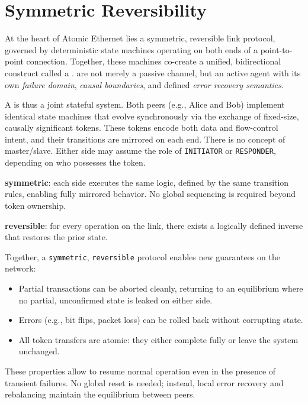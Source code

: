 \documentclass[../../../OAE-SPEC-MAIN.tex]{subfiles}
\begin{document}
\section{Symmetric Reversibility}

At the heart of Atomic Ethernet lies a symmetric, reversible link protocol, governed by deterministic state machines operating on both ends of a point-to-point connection. Together, these machines co-create a unified, bidirectional construct called a \LINK. \LINKs are not merely a passive channel, but an active agent with its own \textit{failure domain}, \textit{causal boundaries}, and defined \textit{error recovery semantics}.

A \LINK is thus a joint stateful system. Both peers (e.g., Alice and Bob) implement identical state machines that evolve synchronously via the exchange of fixed-size, causally significant tokens. These tokens encode both data and flow-control intent, and their transitions are mirrored on each end. There is no concept of master/slave. Either side may assume the role of \texttt{INITIATOR} or \texttt{RESPONDER}, depending on who possesses the token.

\begin{highlightbox}[Definitions]
\textbf{symmetric}: each side executes the same logic, defined by the same transition rules, enabling fully mirrored behavior. No global sequencing is required beyond token ownership.

\textbf{reversible}: for every operation on the link, there exists a logically defined inverse that restores the prior state.
\end{highlightbox}

Together, a \texttt{symmetric}, \texttt{reversible} protocol enables new guarantees on the network:
\begin{itemize}
\item Partial transactions can be aborted cleanly, returning to an equilibrium where no partial, unconfirmed state is leaked on either side.

\item Errors (e.g., bit flips, packet loss) can be rolled back without corrupting state.

\item All token transfers are atomic: they either complete fully or leave the system unchanged.
\end{itemize}

These properties allow \LINKs to resume normal operation even in the presence of transient failures. No global reset is needed; instead, local error recovery and rebalancing maintain the equilibrium between peers.
\end{document}
